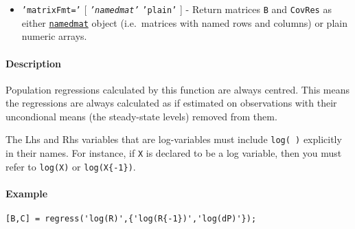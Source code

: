 \begin{itemize}
\itemsep1pt\parskip0pt
\item
  \texttt{'matrixFmt='} {[} \emph{\texttt{'namedmat'}} \textbar{}
  \texttt{'plain'} {]} - Return matrices \texttt{B} and \texttt{CovRes}
  as either \href{namedmat/Contents}{\texttt{namedmat}} object
  (i.e.~matrices with named rows and columns) or plain numeric arrays.
\end{itemize}

\paragraph{Description}\label{description}

Population regressions calculated by this function are always centred.
This means the regressions are always calculated as if estimated on
observations with their uncondional means (the steady-state levels)
removed from them.

The Lhs and Rhs variables that are log-variables must include
\texttt{log( )} explicitly in their names. For instance, if \texttt{X}
is declared to be a log variable, then you must refer to \texttt{log(X)}
or \texttt{log(X\{-1\})}.

\paragraph{Example}\label{example}

\begin{verbatim}
[B,C] = regress('log(R)',{'log(R{-1})','log(dP)'});
\end{verbatim}


